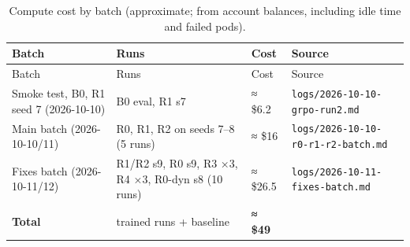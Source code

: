\begin{longtable}[]{@{}
  >{\raggedright\arraybackslash}p{}
  >{\raggedright\arraybackslash}p{}
  >{\raggedright\arraybackslash}p{}
  >{\raggedright\arraybackslash}p{}@{}}
\caption{Compute cost by batch (approximate; from account balances,
including idle time and failed pods).}\label{tbl:3.2}\tabularnewline
\toprule\noalign{}
\begin{minipage}[b]{\linewidth}\raggedright
Batch
\end{minipage} & \begin{minipage}[b]{\linewidth}\raggedright
Runs
\end{minipage} & \begin{minipage}[b]{\linewidth}\raggedright
Cost
\end{minipage} & \begin{minipage}[b]{\linewidth}\raggedright
Source
\end{minipage} \\
\midrule\noalign{}
\endfirsthead
\toprule\noalign{}
\begin{minipage}[b]{\linewidth}\raggedright
Batch
\end{minipage} & \begin{minipage}[b]{\linewidth}\raggedright
Runs
\end{minipage} & \begin{minipage}[b]{\linewidth}\raggedright
Cost
\end{minipage} & \begin{minipage}[b]{\linewidth}\raggedright
Source
\end{minipage} \\
\midrule\noalign{}
\endhead
\bottomrule\noalign{}
\endlastfoot
Smoke test, B0, R1 seed 7 (2026-10-10) & B0 eval, R1 s7 & ≈ \$6.2 &
\texttt{logs/\allowbreak{}2026-\allowbreak{}10-\allowbreak{}10-\allowbreak{}grpo-\allowbreak{}run2.\allowbreak{}md} \\
Main batch (2026-10-10/11) & R0, R1, R2 on seeds 7--8 (5 runs) & ≈ \$16
&
\texttt{logs/\allowbreak{}2026-\allowbreak{}10-\allowbreak{}10-\allowbreak{}r0-\allowbreak{}r1-\allowbreak{}r2-\allowbreak{}batch.\allowbreak{}md} \\
Fixes batch (2026-10-11/12) & R1/R2 s9, R0 s9, R3 ×3, R4 ×3, R0-dyn s8
(10 runs) & ≈ \$26.5 &
\texttt{logs/\allowbreak{}2026-\allowbreak{}10-\allowbreak{}11-\allowbreak{}fixes-\allowbreak{}batch.\allowbreak{}md} \\
\textbf{Total} & 16 trained runs + baseline & \textbf{≈ \$49} & \\
\end{longtable}

